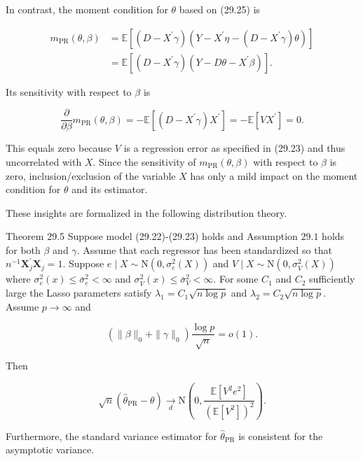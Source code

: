 \documentclass[10pt]{article}
\begin{document}
In contrast, the moment condition for $\theta$ based on (29.25) is

$$
\begin{aligned}
m_{\mathrm{PR}}(\theta, \beta) &=\mathbb{E}\left[\left(D-X^{\prime} \gamma\right)\left(Y-X^{\prime} \eta-\left(D-X^{\prime} \gamma\right) \theta\right)\right] \\
&=\mathbb{E}\left[\left(D-X^{\prime} \gamma\right)\left(Y-D \theta-X^{\prime} \beta\right)\right] .
\end{aligned}
$$

Its sensitivity with respect to $\beta$ is

$$
\frac{\partial}{\partial \beta} m_{\mathrm{PR}}(\theta, \beta)=-\mathbb{E}\left[\left(D-X^{\prime} \gamma\right) X^{\prime}\right]=-\mathbb{E}\left[V X^{\prime}\right]=0 .
$$

This equals zero because $V$ is a regression error as specified in (29.23) and thus uncorrelated with $X$. Since the sensitivity of $m_{\mathrm{PR}}(\theta, \beta)$ with respect to $\beta$ is zero, inclusion/exclusion of the variable $X$ has only a mild impact on the moment condition for $\theta$ and its estimator.

These insights are formalized in the following distribution theory.

Theorem 29.5 Suppose model (29.22)-(29.23) holds and Assumption $29.1$ holds for both $\beta$ and $\gamma$. Assume that each regressor has been standardized so that $n^{-1} \boldsymbol{X}_{j}^{\prime} \boldsymbol{X}_{j}=1$. Suppose $e \mid X \sim \mathrm{N}\left(0, \sigma_{e}^{2}(X)\right)$ and $V \mid X \sim \mathrm{N}\left(0, \sigma_{V}^{2}(X)\right)$ where $\sigma_{e}^{2}(x) \leq \bar{\sigma}_{e}^{2}<\infty$ and $\sigma_{V}^{2}(x) \leq \bar{\sigma}_{V}^{2}<\infty$. For some $C_{1}$ and $C_{2}$ sufficiently large the Lasso parameters satisfy $\lambda_{1}=C_{1} \sqrt{n \log p}$ and $\lambda_{2}=C_{2} \sqrt{n \log p}$. Assume $p \rightarrow \infty$ and

$$
\left(\|\beta\|_{0}+\|\gamma\|_{0}\right) \frac{\log p}{\sqrt{n}}=o(1) .
$$

Then

$$
\sqrt{n}\left(\widehat{\theta}_{\mathrm{PR}}-\theta\right) \underset{d}{\rightarrow} \mathrm{N}\left(0, \frac{\mathbb{E}\left[V^{2} e^{2}\right]}{\left(\mathbb{E}\left[V^{2}\right]\right)^{2}}\right) .
$$

Furthermore, the standard variance estimator for $\widehat{\theta}_{\mathrm{PR}}$ is consistent for the asymptotic variance.
\end{document}
